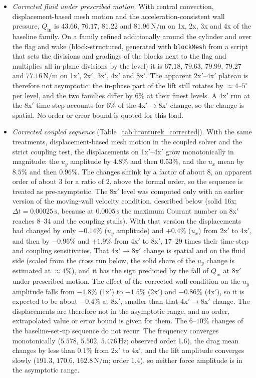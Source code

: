 \begin{itemize}
	\item \emph{Corrected fluid under prescribed motion.} With central convection, displacement-based mesh motion and the acceleration-consistent wall pressure, $Q_\mathrm{in}$ is $43.66$, $76.17$, $81.22$ and $81.96\,\mathrm{N/m}$ on 1x, 2x, 3x and 4x of the baseline family. On a family refined additionally around the cylinder and over the flag and wake (block-structured, generated with \texttt{blockMesh} from a script that sets the divisions and gradings of the blocks next to the flag and multiplies all in-plane divisions by the level) it is $67.18$, $79.63$, $79.99$, $79.27$ and $77.16\,\mathrm{N/m}$ on 1x$'$, 2x$'$, 3x$'$, 4x$'$ and 8x$'$. The apparent 2x$'$--4x$'$ plateau is therefore not asymptotic: the in-phase part of the lift still rotates by $\approx4$--$5^\circ$ per level, and the two families differ by $6\%$ at their finest levels. A 4x$'$ run at the 8x$'$ time step accounts for $6\%$ of the 4x$'\to$8x$'$ change, so the change is spatial. No order or error bound is quoted for this load.
	\item \emph{Corrected coupled sequence} (Table~\ref{tab:hronturek_corrected}). With the same treatments, displacement-based mesh motion in the coupled solver and the strict coupling test, the displacements on 1x$'$--4x$'$ grow monotonically in magnitude: the $u_y$ amplitude by $4.8\%$ and then $0.53\%$, and the $u_x$ mean by $8.5\%$ and then $0.96\%$. The changes shrink by a factor of about $8$, an apparent order of about 3 for a ratio of 2, above the formal order, so the sequence is treated as pre-asymptotic. The 8x$'$ level was computed only with an earlier version of the moving-wall velocity condition, described below (solid 16x; $\Delta t = 0.00025\,\mathrm{s}$, because at $0.0005\,\mathrm{s}$ the maximum Courant number on 8x$'$ reaches 8--34 and the coupling stalls). With that version the displacements had changed by only $-0.14\%$ ($u_y$ amplitude) and $+0.4\%$ ($u_x$) from 2x$'$ to 4x$'$, and then by $-0.96\%$ and $+1.9\%$ from 4x$'$ to 8x$'$, $17$--$29$ times their time-step and coupling sensitivities. That 4x$'\to$8x$'$ change is spatial and on the fluid side (scaled from the cross run below, the solid share of the $u_y$ change is estimated at $\approx4\%$), and it has the sign predicted by the fall of $Q_\mathrm{in}$ at 8x$'$ under prescribed motion. The effect of the corrected wall condition on the $u_y$ amplitude falls from $-1.8\%$ (1x$'$) to $-1.5\%$ (2x$'$) and $-0.86\%$ (4x$'$), so it is expected to be about $-0.4\%$ at 8x$'$, smaller than that 4x$'\to$8x$'$ change. The displacements are therefore not in the asymptotic range, and no order, extrapolated value or error bound is given for them. The $6$--$10\%$ changes of the baseline-set-up sequence do not recur. The frequency converges monotonically ($5.578$, $5.502$, $5.476\,\mathrm{Hz}$; observed order 1.6), the drag mean changes by less than $0.1\%$ from 2x$'$ to 4x$'$, and the lift amplitude converges slowly ($191.3$, $170.6$, $162.8\,\mathrm{N/m}$; order 1.4), so neither force amplitude is in the asymptotic range.

\end{itemize}
